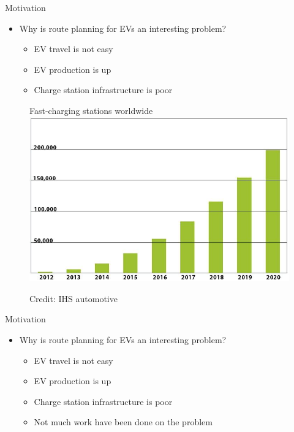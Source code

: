 \begin{frame}{Motivation}
\begin{itemize}
\item Why is route planning for EVs an interesting problem?
\begin{itemize}
\item EV travel is not easy
\item EV production is up
\item Charge station infrastructure is poor
\end{itemize}
\end{itemize}
\begin{figure}[h!]
  \centering
  Fast-charging stations worldwide
    \includegraphics[height=0.4\textwidth]{images/forecast2}
  
      \tiny Credit: IHS automotive
\end{figure}
\vspace{20cm}
\end{frame}

\begin{frame}{Motivation}
\begin{itemize}
\item Why is route planning for EVs an interesting problem?
\begin{itemize}
\item EV travel is not easy
\item EV production is up
\item Charge station infrastructure is poor
\item Not much work have been done on the problem
\end{itemize}
\end{itemize}
\vspace{20cm}
\end{frame}
